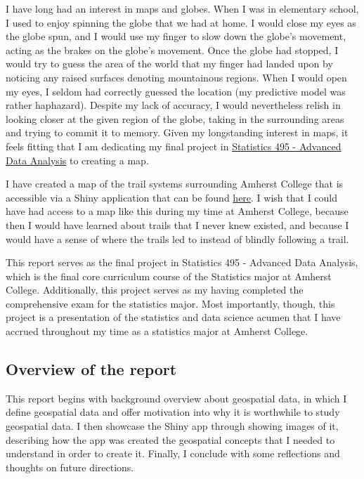 \documentclass[12pt]{article}
\begin{document}
I have long had an interest in maps and globes. When I was in elementary
school, I used to enjoy spinning the globe that we had at home. I would
close my eyes as the globe spun, and I would use my finger to slow down
the globe's movement, acting as the brakes on the globe's movement. Once
the globe had stopped, I would try to guess the area of the world that
my finger had landed upon by noticing any raised surfaces denoting
mountainous regions. When I would open my eyes, I seldom had correctly
guessed the location (my predictive model was rather haphazard). Despite
my lack of accuracy, I would nevertheless relish in looking closer at
the given region of the globe, taking in the surrounding areas and
trying to commit it to memory. Given my longstanding interest in maps,
it feels fitting that I am dedicating my final project in
\href{https://www.amherst.edu/academiclife/departments/courses/2021F/STAT/STAT-495-2021F}{Statistics
495 - Advanced Data Analysis} to creating a map.

I have created a map of the trail systems surrounding Amherst College
that is accessible via a Shiny application that can be found
\href{https://nfrontero20.shinyapps.io/leaflet/}{here}. I wish that I
could have had access to a map like this during my time at Amherst
College, because then I would have learned about trails that I never
knew existed, and because I would have a sense of where the trails led
to instead of blindly following a trail.

This report serves as the final project in Statistics 495 - Advanced
Data Analysis, which is the final core curriculum course of the
Statistics major at Amherst College. Additionally, this project serves
as my having completed the comprehensive exam for the statistics major.
Most importantly, though, this project is a presentation of the
statistics and data science acumen that I have accrued throughout my
time as a statistics major at Amherst College.

\hypertarget{overview-of-the-report}{%
\subsection{Overview of the report}\label{overview-of-the-report}}

This report begins with background overview about geospatial data, in
which I define geospatial data and offer motivation into why it is
worthwhile to study geospatial data. I then showcase the Shiny app
through showing images of it, describing how the app was created the
geospatial concepts that I needed to understand in order to create it.
Finally, I conclude with some reflections and thoughts on future
directions.
\end{document}

